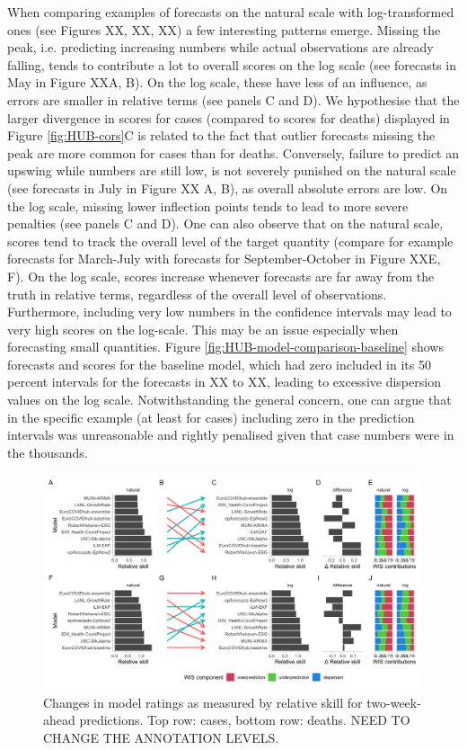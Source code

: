 \documentclass{article}
\begin{document}
When comparing examples of forecasts on the natural scale with log-transformed ones (see Figures XX, XX, XX) a few interesting patterns emerge. Missing the peak, i.e. predicting increasing numbers while actual observations are already falling, tends to contribute a lot to overall scores on the log scale (see forecasts in May in Figure XXA, B). On the log scale, these have less of an influence, as errors are smaller in relative terms (see panels C and D). We hypothesise that the larger divergence in scores for cases (compared to scores for deaths) displayed in Figure \ref{fig:HUB-cors}C is related to the fact that outlier forecasts missing the peak are more common for cases than for deaths. 
Conversely, failure to predict an upswing while numbers are still low, is not severely punished on the natural scale (see forecasts in July in Figure XX A, B), as overall absolute errors are low. On the log scale, missing lower inflection points tends to lead to more severe penalties (see panels C and D). One can also observe that on the natural scale, scores tend to track the overall level of the target quantity (compare for example forecasts for March-July with forecasts for September-October in Figure XXE, F). On the log scale, scores increase whenever forecasts are far away from the truth in relative terms, regardless of the overall level of observations. Furthermore, including very low numbers in the confidence intervals may lead to very high scores on the log-scale. This may be an issue especially when forecasting small quantities. Figure \ref{fig:HUB-model-comparison-baseline} shows forecasts and scores for the baseline model, which had zero included in its 50 percent intervals for the forecasts in XX to XX, leading to excessive dispersion values on the log scale. Notwithstanding the general concern, one can argue that in the specific example (at least for cases) including zero in the prediction intervals was unreasonable and rightly penalised given that case numbers were in the thousands. 

\begin{figure}[h!]
    \centering
    \includegraphics[width=0.99\textwidth]{output/figures/HUB-pairwise-comparisons.png}
    \caption{Changes in model ratings as measured by relative skill for two-week-ahead predictions. Top row: cases, bottom row: deaths. NEED TO CHANGE THE ANNOTATION LEVELS.}
    \label{fig:HUB-pairwise}
\end{figure}
\end{document}
